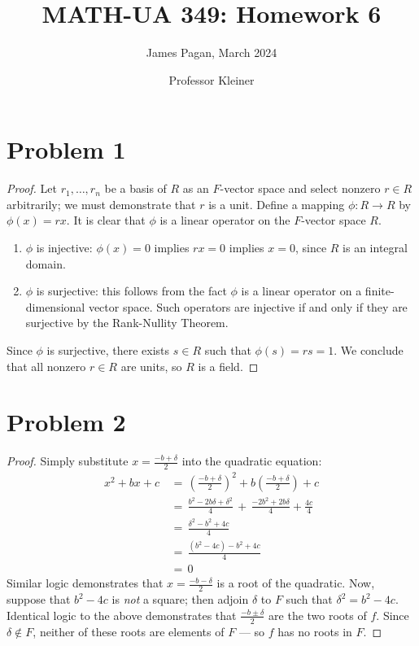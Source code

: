 \documentclass[11pt]{article}
\title{MATH-UA 349: Homework 6}
\author{James Pagan, March 2024}
\date{Professor Kleiner}
\begin{document}
\maketitle
\tableofcontents
\newpage


\section{Problem 1}

\begin{proof}
  Let $r_{1}, \ldots, r_{n}$ be a basis of $R$ as an $F$-vector space and select nonzero $r \in R$ arbitrarily; we must demonstrate that $r$ is a unit. Define a mapping $\phi : R \to R$ by $\phi(x) = rx$. It is clear that $\phi$ is a linear operator on the $F$-vector space $R$.
  \begin{enumerate}
    \item $\phi$ is injective: $\phi(x) = 0$ implies $rx = 0$ implies $x = 0$, since $R$ is an integral domain.
    \item $\phi$ is surjective: this follows from the fact $\phi$ is a linear operator on a finite-dimensional vector space. Such operators are injective if and only if they are surjective by the Rank-Nullity Theorem.
  \end{enumerate}
  Since $\phi$ is surjective, there exists $s \in R$ such that $\phi(s) = rs = 1$. We conclude that all nonzero $r \in R$ are units, so $R$ is a field.
\end{proof}


\section{Problem 2}

\begin{proof}
  Simply substitute $x = \tfrac{-b + \delta}{2}$ into the quadratic equation:
  \begin{align*}
    x^{2} + bx + c \, &= \, \left( \frac{-b + \delta}{2} \right)^{2} + b \left( \frac{-b + \delta}{2} \right) + c \\
                      &= \, \frac{b^{2} - 2b \delta + \delta^{2}}{4} \, + \, \frac{-2b^{2} + 2b \delta}{4} + \frac{4c}{4} \\
                      &= \, \frac{\delta^{2} - b^{2} + 4c}{4} \\
                      &= \, \frac{(b^{2} - 4c) - b^{2} + 4c}{4} \\
                      &= \, 0
  \end{align*}
  Similar logic demonstrates that $x = \tfrac{-b - \delta}{2}$ is a root of the quadratic. Now, suppose that $b^{2} - 4c$ is \textit{not} a square; then adjoin $\delta$ to $F$ such that $\delta^{2} = b^{2} - 4c$. Identical logic to the above demonstrates that $\tfrac{-b \pm \delta}{2}$ are the two roots of $f$. Since $\delta \notin F$, neither of these roots are elements of $F$ --- so $f$ has no roots in $F$.
\end{proof}
\end{document}
